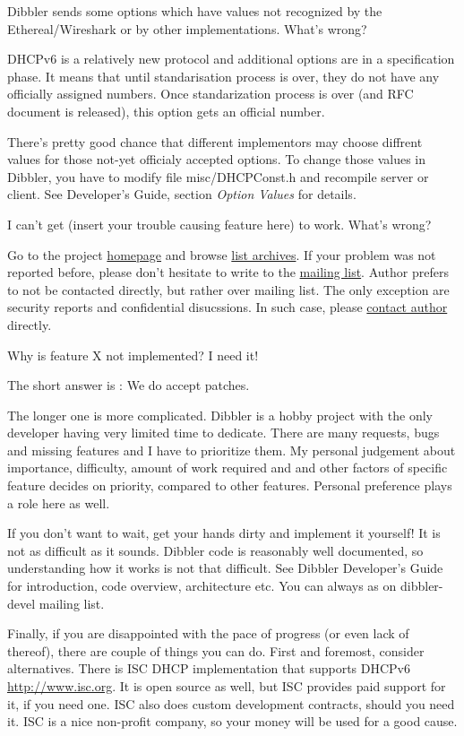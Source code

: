 \Q Dibbler sends some options which have values not recognized by the
Ethereal/Wireshark or by other implementations. What's wrong?

\A DHCPv6 is a relatively new protocol and additional options are in a
specification phase. It means that until standarisation process is
over, they do not have any officially assigned numbers. Once
standarization process is over (and RFC document is released), this
option gets an official number.

There's pretty good chance that different implementors may choose
diffrent values for those not-yet officialy accepted options. To
change those values in Dibbler, you have to modify file
misc/DHCPConst.h and recompile server or client. See Developer's
Guide, section \emph{Option Values} for details.

\Q I can't get (insert your trouble causing feature here) to
work. What's wrong?

\A Go to the project \href{http://klub.com.pl/dhcpv6/}{homepage} and
browse \href{http://klub.com.pl/lists/dibbler/}{list archives}. If
your problem was not reported before, please don't hesitate to write
to the
\href{http://klub.com.pl/cgi-bin/mailman/listinfo/dibbler}{mailing
  list}. Author prefers to not be contacted directly, but rather over
mailing list. The only exception are security reports and confidential
disucssions. In such case, please \href{mailto:thomson(at)klub.com.pl}{contact author} directly.

\Q Why is feature X not implemented? I need it!

\Q The short answer is : We do accept patches.

The longer one is more complicated. Dibbler is a hobby project with
the only developer having very limited time to dedicate. There are
many requests, bugs and missing features and I have to prioritize
them. My personal judgement about importance, difficulty, amount of
work required and and other factors of specific feature decides on
priority, compared to other features. Personal preference plays a role
here as well.

If you don't want to wait, get your hands dirty and implement it
yourself! It is not as difficult as it sounds. Dibbler code is
reasonably well documented, so understanding how it works is not that
difficult. See Dibbler Developer's Guide for introduction, code
overview, architecture etc. You can always as on dibbler-devel mailing
list.

Finally, if you are disappointed with the pace of progress (or even
lack of thereof), there are couple of things you can do. First and
foremost, consider alternatives. There is ISC DHCP implementation that
supports DHCPv6 \href{http://www.isc.org/software/dhcp}{http://www.isc.org}.
It is open source as well, but ISC provides paid support for it, if
you need one. ISC also does custom development contracts, should you
need it. ISC is a nice non-profit company, so your money will be used
for a good cause.


